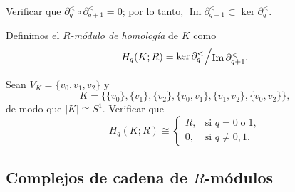 \begin{ejercicio}
Verificar que $\partial_q^< \circ \partial_{q+1}^< = 0$; por lo tanto, $\operatorname{Im} \partial_{q+1}^< \subset \ker \partial_q^<$.
\end{ejercicio}

\begin{definicion}
Definimos el \textit{$R$-módulo de homología} de $K$ como
\[
H_q(K; R) = \raisebox{0.2ex}{$\ker \partial_q^<$} \Big/ \raisebox{-0.2ex}{$\operatorname{Im} \partial_{q+1}^<$}.
\]
\end{definicion}

\begin{ejercicio}
Sean $V_K = \{v_0, v_1, v_2\}$ y
\[
K = \big\{ \{v_0\}, \{v_1\}, \{v_2\}, \{v_0, v_1\}, \{v_1, v_2\}, \{v_0, v_2\} \big\},
\]
de modo que $|K| \cong S^1$. Verificar que
\[
H_q(K; R) \cong 
\begin{cases}
    R, & \text{si } q = 0 \; \text{o} \; 1, \\
    0, & \text{si } q \neq 0, 1.
\end{cases}
\]
\end{ejercicio}

\subsection{Complejos de cadena de $R$-módulos}


